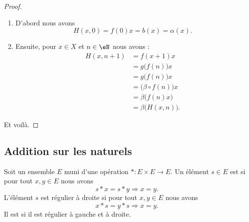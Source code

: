 \begin{proof}
    \begin{enumerate}
        \item
            D'abord nous avons
            \begin{equation}
                H(x,0)=f(0)x=b(x)=\alpha(x).
            \end{equation}
        \item
            Ensuite, pour \( x\in X\) et \( n\in \eN\) nous avons :
            \begin{subequations}
                \begin{align}
                    H(x,n+1)&=f(x+1)x\\
                    &=g\big( f(n) \big)x\\
                    &=g\big( f(n) \big)x\\
                    &=\big( \beta\circ f(n) \big)x\\
                    &=\beta\big( f(n)x \big)\\
                    &=\beta\big( H(x,n) \big).
                \end{align}
            \end{subequations}
    \end{enumerate}
    Et voilà.
\end{proof}

\subsection{Addition sur les naturels}

\begin{definition}        \label{DEFooIJIEooZaAdSs}
    Soit un ensemble \( E\) muni d'une opération \( *\colon E\times E\to E\). Un élément \( s\in E\) est  si pour tout \( x,y\in E\) nous avons
    \begin{equation}
        s*x=s*y\Rightarrow x=y.
    \end{equation}
    L'élément \( s\) est régulier à droite si pour tout \( x,y\in E\) nous avons
    \begin{equation}
        x*s=y*s\Rightarrow x=y.
    \end{equation}
    Il est  si il est régulier à gauche et à droite.
\end{definition}

